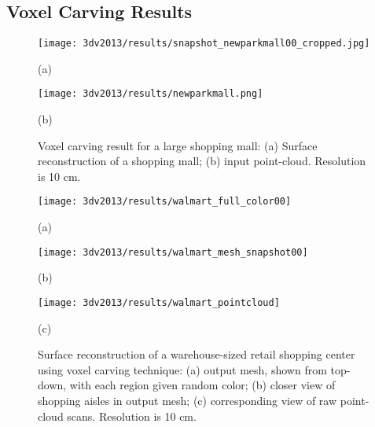 \documentclass[12pt,onecolumn,oneside]{book}
\begin{document}
\subsection{Voxel Carving Results}
\label{ssec:3dv2013_results}


\begin{figure}
	\begin{minipage}[t]{0.4\linewidth}
	\centerline{\texttt{[image: 3dv2013/results/snapshot\_newparkmall00\_cropped.jpg]}}
	\centerline{(a)}
	\end{minipage}
	\hfill
	\begin{minipage}[t]{0.55\linewidth}
	\centerline{\texttt{[image: 3dv2013/results/newparkmall.png]}}
	\centerline{(b)}
	\end{minipage}
	\caption[Voxel carving result for a large shopping mall.]{Voxel carving result for a large shopping mall:  (a) Surface reconstruction of a shopping mall; (b) input point-cloud.  Resolution is 10 cm.}
	\label{fig:3dv2013_newparkmall}
\end{figure}

\begin{figure}[p]
	\begin{minipage}[b]{0.98\linewidth}
	\centerline{\texttt{[image: 3dv2013/results/walmart\_full\_color00]}}
	\centerline{(a)}
	\end{minipage}
	\begin{minipage}[b]{0.48\linewidth}
	\centerline{\texttt{[image: 3dv2013/results/walmart\_mesh\_snapshot00]}}
	\centerline{(b)}
	\end{minipage}
	\hfill
	\begin{minipage}[b]{0.48\linewidth}
	\centerline{\texttt{[image: 3dv2013/results/walmart\_pointcloud]}}
	\centerline{(c)}
	\end{minipage}
	\caption[Voxel carving of warehouse-sized retail center.]{Surface reconstruction of a warehouse-sized retail shopping center using voxel carving technique: (a) output mesh, shown from top-down, with each region given random color; (b) closer view of shopping aisles in output mesh; (c) corresponding view of raw point-cloud scans.  Resolution is 10 cm.}
	\label{fig:3dv2013_walmart}
\end{figure}
\end{document}
